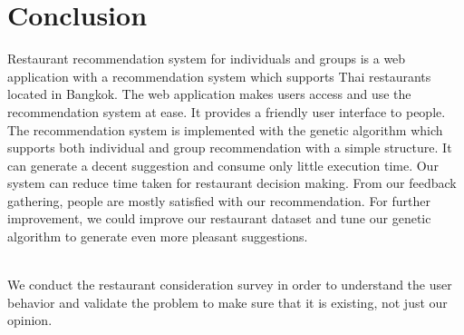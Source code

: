 \documentclass[12pt,oneside,openright,a4paper]{cpe-english-project}
\begin{document}
\section{Conclusion}

Restaurant recommendation system for individuals and groups is a web application with a recommendation system which supports Thai restaurants located in Bangkok. The web application makes users access and use the recommendation system at ease. It provides a friendly user interface to people. The recommendation system is implemented with the genetic algorithm which supports both individual and group recommendation with a simple structure. It can generate a decent suggestion and consume only little execution time. Our system can reduce time taken for restaurant decision making. From our feedback gathering, people are mostly satisfied with our recommendation. For further improvement, we could improve our restaurant dataset and tune our genetic algorithm to generate even more pleasant suggestions.






 \\

We conduct the restaurant consideration survey in order to understand the user behavior and validate the problem to make sure that it is existing, not just our opinion.
\end{document}
